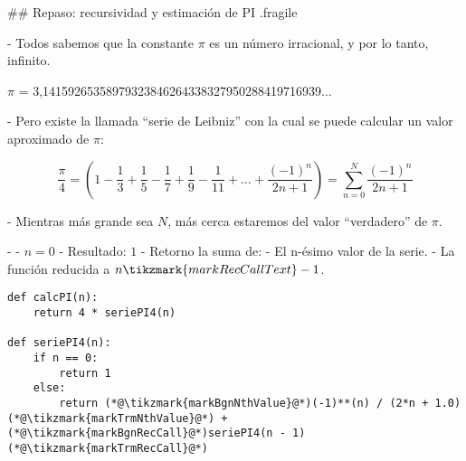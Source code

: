 ## Repaso: recursividad y estimación de PI {.fragile}


- Todos sabemos que la constante $\pi$ es un número irracional, y por lo tanto, infinito.

\begin{center}
\textsf{$\pi$ = 3,14159265358979323846264338327950288419716939$\ldots$}
\end{center}



- Pero existe la llamada ``serie de Leibniz'' con la cual se puede calcular un valor aproximado de $\pi$:

\vspace{-3ex}
$$ \frac{\pi}{4} = \left( 1 - \frac{1}{3} + \frac{1}{5} - \frac{1}{7} + \frac{1}{9} - \frac{1}{11} + \ldots + \frac{(-1)^{n}}{2n + 1} \right) = \sum_{n=0}^{N} \frac{(-1)^{n}}{2n + 1} $$



- Mientras más grande sea $N$, más cerca estaremos del valor ``verdadero'' de $\pi$.




- 
    - $n = 0$
    - Resultado: $1$
-  Retorno la suma de:
    - El n-ésimo valor de la serie.
    - La función reducida a $n \tikzmark{markRecCallText}- 1$.



\vspace{2ex}

\begin{lstlisting}[style=frame02]
def calcPI(n):
    return 4 * seriePI4(n)

def seriePI4(n):
    if n == 0:
        return 1
    else:
        return (*@\tikzmark{markBgnNthValue}@*)(-1)**(n) / (2*n + 1.0)(*@\tikzmark{markTrmNthValue}@*) + (*@\tikzmark{markBgnRecCall}@*)seriePI4(n - 1)(*@\tikzmark{markTrmRecCall}@*)
\end{lstlisting}



